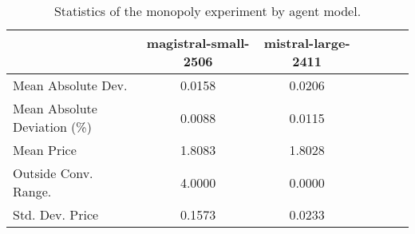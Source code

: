 \begin{table}[H]
\caption{Statistics of the monopoly experiment by agent model.}
\label{tab:monopoly_stats}
\begin{tabular}{lcccccc}
\toprule
 & magistral-small-2506 & mistral-large-2411 \\
\midrule
Mean Absolute Dev. & 0.0158 & 0.0206 \\
Mean Absolute Deviation (\%) & 0.0088 & 0.0115 \\
Mean Price & 1.8083 & 1.8028 \\
Outside Conv. Range. & 4.0000 & 0.0000 \\
Std. Dev. Price & 0.1573 & 0.0233 \\
\bottomrule
\end{tabular}
\end{table}
